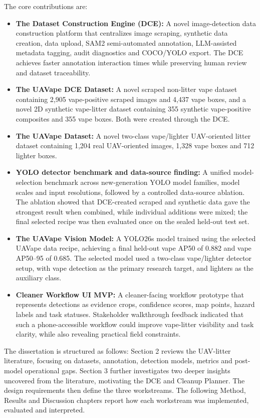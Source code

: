 The core contributions are:

\begin{itemize}
    \item \textbf{The Dataset Construction Engine (DCE):} A novel image-detection data construction platform that centralizes image scraping, synthetic data creation, data upload, SAM2 semi-automated annotation, LLM-assisted metadata tagging, audit diagnostics and COCO/YOLO export. The DCE achieves faster annotation interaction times while preserving human review and dataset traceability.

    \item \textbf{The UAVape DCE Dataset:} A novel scraped non-litter vape dataset containing 2,905 vape-positive scraped images and 4,437 vape boxes, and a novel 2D synthetic vape-litter dataset containing 355 synthetic vape-positive composites and 355 vape boxes. Both were created through the DCE.

    \item \textbf{The UAVape Dataset:} A novel two-class vape/lighter UAV-oriented litter dataset containing 1,204 real UAV-oriented images, 1,328 vape boxes and 712 lighter boxes.

    \item \textbf{YOLO detector benchmark and data-source finding:} A unified model-selection benchmark across new-generation YOLO model families, model scales and input resolutions, followed by a controlled data-source ablation. The ablation showed that DCE-created scraped and synthetic data gave the strongest result when combined, while individual additions were mixed; the final selected recipe was then evaluated once on the sealed held-out test set.
    
    \item \textbf{The UAVape Vision Model:} A YOLO26s model trained using the selected UAVape data recipe, achieving a final held-out vape AP50 of 0.882 and vape AP50--95 of 0.685. The selected model used a two-class vape/lighter detector setup, with vape detection as the primary research target, and lighters as the auxiliary class.

    \item \textbf{Cleaner Workflow UI MVP:} A cleaner-facing workflow prototype that represents detections as evidence crops, confidence scores, map points, hazard labels and task statuses. Stakeholder walkthrough feedback indicated that such a phone-accessible workflow could improve vape-litter visibility and task clarity, while also revealing practical field constraints.
\end{itemize}

The dissertation is structured as follows: Section 2 reviews the UAV-litter literature, focusing on datasets, annotation, detection models, metrics and post-model operational gaps. Section 3 further investigates two deeper insights uncovered from the literature, motivating the DCE and Cleanup Planner. The design requirements then define the three workstreams. The following Method, Results and Discussion chapters report how each workstream was implemented, evaluated and interpreted.
